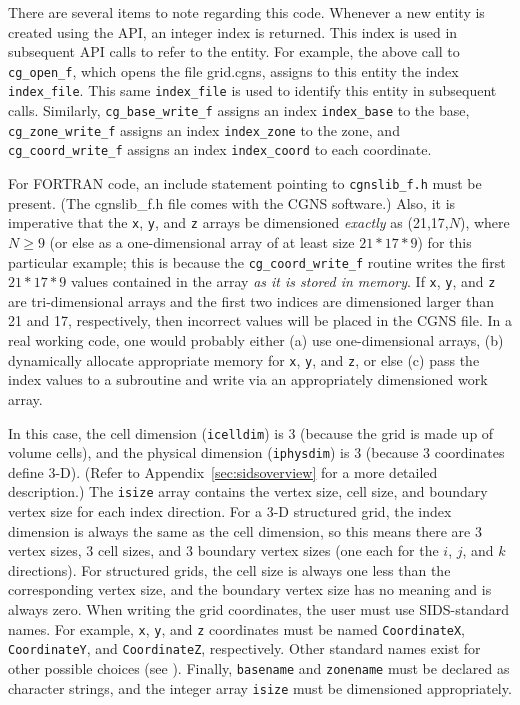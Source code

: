 \documentclass[12pt]{article}
\begin{document}
\noindent There are several items to note regarding this
code.  Whenever a new entity is created using the API,
an integer index is returned.  This index is used in subsequent
API calls to refer to the entity.  For example, the above call to
{\tt cg\_open\_f}, which opens the file grid.cgns, assigns to this
entity the index {\tt index\_file}.  This same {\tt index\_file}
is used to identify this entity in subsequent calls.
Similarly, {\tt cg\_base\_write\_f} assigns an index {\tt index\_base} to
the base, {\tt cg\_zone\_write\_f} 
assigns an index {\tt index\_zone} to the zone, and
{\tt cg\_coord\_write\_f} assigns an index {\tt index\_coord}
to each coordinate.

For FORTRAN code, an include statement
pointing to {\tt cgnslib\_f.h} must be present.  (The cgnslib\_f.h
file comes with the CGNS software.)  Also, it is
imperative that the {\tt x}, {\tt y}, and {\tt z} arrays be dimensioned
{\it exactly} as (21,17,$N$), where $N \geq 9$ (or
else as a one-dimensional array of at least size $21*17*9$) 
for this particular example; 
this is because the {\tt cg\_coord\_write\_f}
routine writes the first $21*17*9$ values contained in the
array {\it as it is stored
in memory}.  If {\tt x}, {\tt y}, and {\tt z} are tri-dimensional arrays
and the first two indices 
are dimensioned larger than 21 and 17, respectively, then incorrect
values will be placed in the CGNS file.  In a real
working code, one would probably either (a) use one-dimensional
arrays, (b) dynamically allocate
appropriate memory for {\tt x}, {\tt y}, and {\tt z}, or else (c) pass the index
values to a subroutine and write via an appropriately dimensioned
work array.

In this case, the cell dimension ({\tt icelldim}) is 3
(because the grid is made up of volume cells), and the
physical dimension ({\tt iphysdim}) is 3 (because 3 coordinates
define 3-D).  (Refer to Appendix~\ref{sec:sidsoverview} for a more
detailed description.)  The {\tt isize} array
contains the vertex size, cell size, and
boundary vertex size for each index direction.  For a 3-D
structured grid, the index dimension is always the same as
the cell dimension, so this
means there are 3 vertex sizes, 3 cell sizes, and 3 boundary vertex sizes
(one each for the $i$, $j$, and $k$ directions).  For structured grids, 
the cell size is always one less than the corresponding vertex
size, and the boundary vertex size has no meaning and is always zero.
When writing the grid coordinates, the user must use SIDS-standard
names.  For example, {\tt x}, {\tt y}, and {\tt z} coordinates must be named
{\tt CoordinateX}, {\tt CoordinateY}, and {\tt CoordinateZ},
respectively.  Other standard names exist for other possible choices
(see \cite{ALLMARAS}).
Finally, {\tt basename} and {\tt zonename} must be declared as character
strings, and the integer array {\tt isize} must be dimensioned
appropriately.
\end{document}
